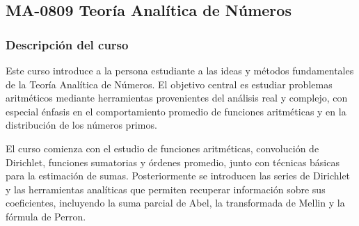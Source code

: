 \newpage
\subsection*{MA-0809 Teoría Analítica de Números}

\hypertarget{MA0809}{}
\begin{refsection}
\begin{table}[H]
\end{table}

\subsubsection*{Descripción del curso}

Este curso introduce a la persona estudiante a las ideas y métodos fundamentales de la Teoría Analítica de Números. El objetivo central es estudiar problemas aritméticos mediante herramientas provenientes del análisis real y complejo, con especial énfasis en el comportamiento promedio de funciones aritméticas y en la distribución de los números primos.

El curso comienza con el estudio de funciones aritméticas, convolución de Dirichlet, funciones sumatorias y órdenes promedio, junto con técnicas básicas para la estimación de sumas. Posteriormente se introducen las series de Dirichlet y las herramientas analíticas que permiten recuperar información sobre sus coeficientes, incluyendo la suma parcial de Abel, la transformada de Mellin y la fórmula de Perron.


\end{refsection}
